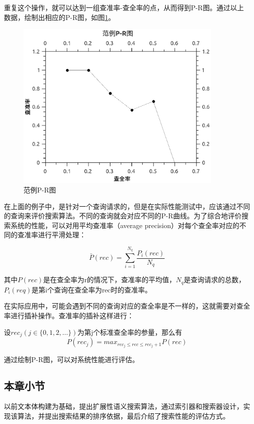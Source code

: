 \documentclass[12pt,a4paper]{article}
\newcommand{\wuhao}{\fontsize{10.5pt}{\baselineskip}\selectfont}
\begin{document}
	重复这个操作，就可以达到一组查准率-查全率的点，从而得到{\Times P-R}图。通过以上数据，绘制出相应的{\Times P-R}图，如图\ref{fig:p-rFigure}。
	\begin{figure}[htbp] 
	\centering\includegraphics[width=4in]{fig/prFigureExample.eps} 
	\caption{\wuhao 范例{\Times P-R}图}\label{fig:p-rFigure} 
	\end{figure} 
	
	在上面的例子中，是针对一个查询请求的，但是在实际性能测试中，应该通过不同的查询来评价搜索算法。不同的查询就会对应不同的P-R曲线。为了综合地评价搜索系统的性能，可以对用平均查准率（{\Times average precision}）对每个查全率对应的不同的查准率进行平滑处理：
	
	\begin{equation}\label{eq:average precision}
	\bar{P}(rec) = \sum_{i=1}^{N_q} \frac{P_i(rec)}{N_q}
	\end{equation}
	
	其中$ {P}(rec) $是在查全率为{\Times r}的情况下，查准率的平均值，$ N_q $是查询请求的总数，$ P_i(req) $是第{\Times i}个查询在查全率为{\Times rec}时的查准率。
	
	在实际应用中，可能会遇到不同的查询对应的查全率是不一样的，这就需要对查全率进行插补操作。查准率的插补这样进行：

	设$rec_j (j \in \{0,1,2,\dots\} )$为第{\Times j}个标准查全率的参量，那么有
	\begin{equation}\label{eq:插补}
	P(rec_j) = max_{rec_j \leq rec \leq rec_j+1}P(rec)
	\end{equation}
	
	通过绘制{\Times P-R}图，可以对系统性能进行评估。
	
	\subsection{本章小节}
	以前文本体构建为基础，提出扩展性语义搜索算法，通过索引器和搜索器设计，实现该算法，并提出搜索结果的排序依据，最后介绍了搜索性能的评估方式。	
	
\end{document}
